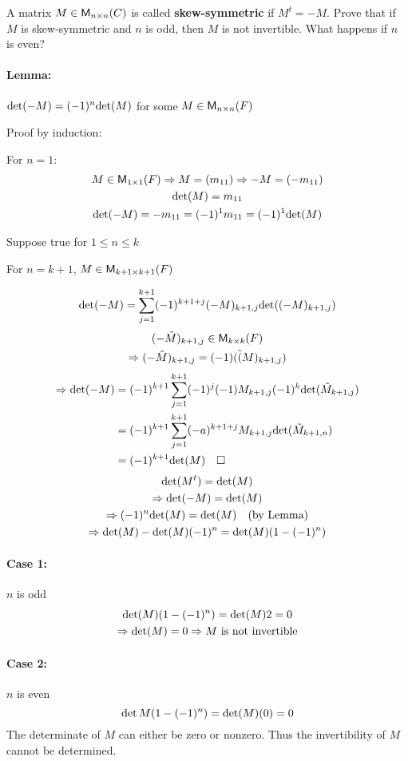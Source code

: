 A matrix $M \in \mathsf{M}_{n \times n}(C)$ is called {\bf skew-symmetric} if
$M^t=-M$. Prove that if $M$ is skew-symmetric and $n$ is odd, then $M$
is not invertible. What happens if $n$ is even?

\paragraph{Lemma: } $\text{det}({-M}) = (-1)^n\text{det}({M})$ for some $M \in
\mathsf{M}_{n \times n}(F)$

Proof by induction:

For $n=1$: 
\begin{gather}
M \in \mathsf{M}_{1 \times 1}(F) \Rightarrow M = (m_{11}) \Rightarrow -M =
(-m_{11})\\
\text{det}({M}) = m_{11}\\
\text{det}({-M}) = -m_{11} = (-1)^1m_{11} = (-1)^1\text{det}({M})
\end{gather}

Suppose true for $1\leq n \leq k$ 

For $n=k+1$, $M \in \mathsf{M}_{k+1 \times k+1}(F)$

\begin{equation}
\text{det}({-M}) =
\sum\limits_{j=1}^{k+1}(-1)^{k+1+j}(-M)_{k+1,j}\text{det}({(-M)_{k+1,j}})
\end{equation}
\begin{gather}
(-\tilde{M})_{k+1,j} \in \mathsf{M}_{k \times k}(F)\\
\Rightarrow (-\tilde{M})_{k+1,j} = (-1)(\tilde(M)_{k+1,j})
\end{gather}
\begin{align}
\Rightarrow \text{det}({-M}) &=
(-1)^{k+1}\sum\limits_{j=1}^{k+1}(-1)^j(-1)M_{k+1,j}(-1)^k\text{det}({\tilde{M}_{k+1,j}})\\
&=
(-1)^{k+1}\sum\limits_{j=1}^{k+1}(-a)^{k+1+j}M_{k+1,j}\text{det}({\tilde{M}_{k+1,n}})\\
&= (-1)^{k+1}\text{det}({M})\quad \square
\end{align}
\begin{gather}
\text{det}({M^t}) = \text{det}({M})\\
\Rightarrow \text{det}({-M}) = \text{det}({M})\\
\Rightarrow (-1)^n\text{det}({M}) = \text{det}({M}) \quad \text{(by Lemma)}\\
\Rightarrow \text{det}({M}) - \text{det}({M})(-1)^n = \text{det}({M})(1- (-1)^n)
\end{gather}
\paragraph{Case 1:} $n$ is odd
\begin{gather}
\text{det}({M})(1-(-1)^n) = \text{det}({M}){2} = 0\\
\Rightarrow \text{det}({M}) = 0
\Rightarrow M \text{ is not invertible} \notag
\end{gather}
\paragraph{Case 2:} $n$ is even
\begin{equation}
\det{M}(1- (-1)^n) =\text{det}({M})(0) = 0
\end{equation}
The determinate of $M$ can either be zero or nonzero. Thus the
invertibility of $M$ cannot be determined.
